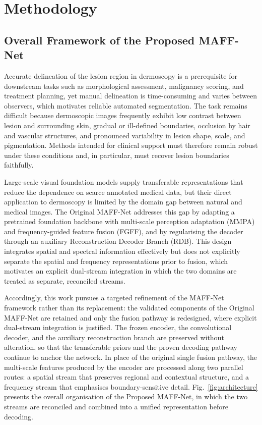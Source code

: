 \section{Methodology}
\label{sec:method}

\subsection{Overall Framework of the Proposed MAFF-Net}

Accurate delineation of the lesion region in dermoscopy is a prerequisite for downstream tasks such as morphological assessment, malignancy scoring, and treatment planning, yet manual delineation is time-consuming and varies between observers, which motivates reliable automated segmentation. The task remains difficult because dermoscopic images frequently exhibit low contrast between lesion and surrounding skin, gradual or ill-defined boundaries, occlusion by hair and vascular structures, and pronounced variability in lesion shape, scale, and pigmentation. Methods intended for clinical support must therefore remain robust under these conditions and, in particular, must recover lesion boundaries faithfully.

Large-scale visual foundation models supply transferable representations that reduce the dependence on scarce annotated medical data, but their direct application to dermoscopy is limited by the domain gap between natural and medical images. The Original MAFF-Net \cite{ref15} addresses this gap by adapting a pretrained foundation backbone with multi-scale perception adaptation (MMPA) and frequency-guided feature fusion (FGFF), and by regularising the decoder through an auxiliary Reconstruction Decoder Branch (RDB). This design integrates spatial and spectral information effectively but does not explicitly separate the spatial and frequency representations prior to fusion, which motivates an explicit dual-stream integration in which the two domains are treated as separate, reconciled streams.

Accordingly, this work pursues a targeted refinement of the MAFF-Net framework rather than its replacement: the validated components of the Original MAFF-Net are retained and only the fusion pathway is redesigned, where explicit dual-stream integration is justified. The frozen encoder, the convolutional decoder, and the auxiliary reconstruction branch are preserved without alteration, so that the transferable priors and the proven decoding pathway continue to anchor the network. In place of the original single fusion pathway, the multi-scale features produced by the encoder are processed along two parallel routes: a spatial stream that preserves regional and contextual structure, and a frequency stream that emphasises boundary-sensitive detail. Fig.~\ref{fig:architecture} presents the overall organisation of the Proposed MAFF-Net, in which the two streams are reconciled and combined into a unified representation before decoding.

